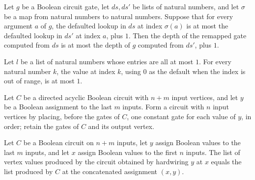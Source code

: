 \begin{theorem}
\label{BoolCircuit.DAGGate.depth_remap_le}
\leanok
{}
Let $g$ be a Boolean circuit gate, let $ds,ds'$ be lists of natural numbers, and let
$\sigma$ be a map from natural numbers to natural numbers. Suppose that for every argument
$a$ of $g$, the defaulted lookup in $ds$ at index $\sigma(a)$ is at most the defaulted
lookup in $ds'$ at index $a$, plus $1$. Then the depth of the remapped gate computed
from $ds$ is at most the depth of $g$ computed from $ds'$, plus $1$.
\end{theorem}

\begin{theorem}
\label{BoolCircuit.getD_le_one}
\leanok
{}
Let $l$ be a list of natural numbers whose entries are all at most $1$. For every
natural number $k$, the value at index $k$, using $0$ as the default when the index is
out of range, is at most $1$.
\end{theorem}

\begin{definition}
\label{BoolCircuit.DAGCircuit.hardwire}
\leanok
{}
Let $C$ be a directed acyclic Boolean circuit with $n+m$ input vertices, and let $y$ be
a Boolean assignment to the last $m$ inputs. Form a circuit with $n$ input vertices by
placing, before the gates of $C$, one constant gate for each value of $y$, in order;
retain the gates of $C$ and its output vertex.
\end{definition}

\begin{theorem}
\label{BoolCircuit.DAGCircuit.hardwire_values}
\leanok
{}
Let $C$ be a Boolean circuit on $n+m$ inputs, let $y$ assign Boolean values to the last
$m$ inputs, and let $x$ assign Boolean values to the first $n$ inputs. The list of
vertex values produced by the circuit obtained by hardwiring $y$ at $x$ equals the list
produced by $C$ at the concatenated assignment $(x,y)$.
\end{theorem}

